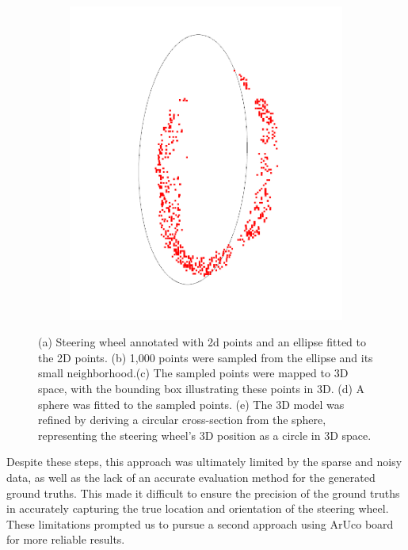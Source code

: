 \begin{figure}[ht]
\begin{subfigure}[t]{0.18\textwidth}
        \caption{}
        \label{fig:sphere}
    \end{subfigure}\hfill
    \begin{subfigure}[t]{0.18\textwidth}
        \centering
        \includegraphics[width=\textwidth]{media/chapter 4/circl.png}
        \caption{}
        \label{fig:circle}
    \end{subfigure}\hfill
    \caption{(a) Steering wheel annotated with 2d points 
    and an ellipse fitted to the 2D points. (b) 1,000 points were sampled from the ellipse 
    and its small neighborhood.(c) The sampled points were mapped to 3D space, 
    with the bounding box illustrating these points in 3D. 
    (d) A sphere was fitted to the sampled points. 
    (e) The 3D model was refined by deriving a 
    circular cross-section from the sphere, representing 
    the steering wheel’s 3D position as a circle in 
    3D space.}
\end{figure}


Despite these steps, this approach was ultimately limited by the sparse and noisy data, as well as the lack of an accurate evaluation method 
for the generated ground truths. This made it difficult to ensure the 
precision of the ground truths in accurately capturing the true location and orientation of the 
steering wheel. These limitations prompted us to pursue a second 
approach using ArUco board for more reliable results.

